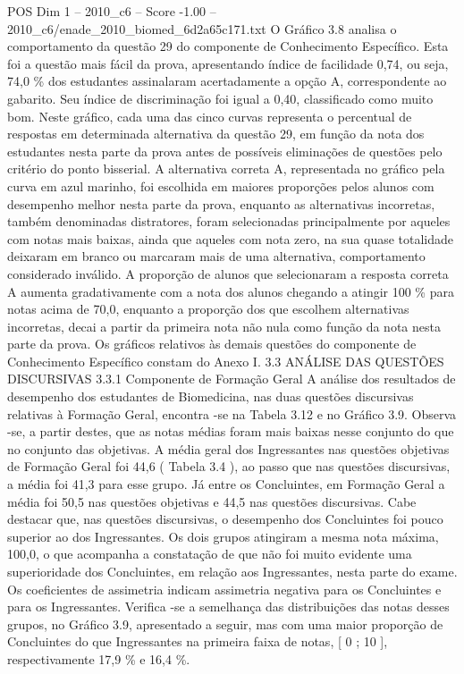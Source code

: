 \begin{textsample}{POS Dim 1 – 2010\_c6 – Score -1.00 – 2010\_c6/enade\_2010\_biomed\_6d2a65c171.txt}
O Gráfico 3.8 analisa o comportamento da questão 29 do componente de Conhecimento Específico.
Esta foi a questão mais fácil da prova, apresentando índice de facilidade 0,74, ou seja, 74,0 \% dos estudantes assinalaram acertadamente a opção A, correspondente ao gabarito.
Seu índice de discriminação foi igual a 0,40, classificado como muito bom.
Neste gráfico, cada uma das cinco curvas representa o percentual de respostas em determinada alternativa da questão 29, em função da nota dos estudantes nesta parte da prova antes de possíveis eliminações de questões pelo critério do ponto bisserial.
A alternativa correta A, representada no gráfico pela curva em azul marinho, foi escolhida em maiores proporções pelos alunos com desempenho melhor nesta parte da prova, enquanto as alternativas incorretas, também denominadas distratores, foram selecionadas principalmente por aqueles com notas mais baixas, ainda que aqueles com nota zero, na sua quase totalidade deixaram em branco ou marcaram mais de uma alternativa, comportamento considerado inválido.
A proporção de alunos que selecionaram a resposta correta A aumenta gradativamente com a nota dos alunos chegando a atingir 100 \% para notas acima de 70,0, enquanto a proporção dos que escolhem alternativas incorretas, decai a partir da primeira nota não nula como função da nota nesta parte da prova.
Os gráficos relativos às demais questões do componente de Conhecimento Específico constam do Anexo I. 3.3 ANÁLISE DAS QUESTÕES DISCURSIVAS 3.3.1 Componente de Formação Geral A análise dos resultados de desempenho dos estudantes de Biomedicina, nas duas questões discursivas relativas à Formação Geral, encontra -se na Tabela 3.12 e no Gráfico 3.9.
Observa -se, a partir destes, que as notas médias foram mais baixas nesse conjunto do que no conjunto das objetivas.
A média geral dos Ingressantes nas questões objetivas de Formação Geral foi 44,6 ( Tabela 3.4 ), ao passo que nas questões discursivas, a média foi 41,3 para esse grupo.
Já entre os Concluintes, em Formação Geral a média foi 50,5 nas questões objetivas e 44,5 nas questões discursivas.
Cabe destacar que, nas questões discursivas, o desempenho dos Concluintes foi pouco superior ao dos Ingressantes.
Os dois grupos atingiram a mesma nota máxima, 100,0, o que acompanha a constatação de que não foi muito evidente uma superioridade dos Concluintes, em relação aos Ingressantes, nesta parte do exame.
Os coeficientes de assimetria indicam assimetria negativa para os Concluintes e para os Ingressantes.
Verifica -se a semelhança das distribuições das notas desses grupos, no Gráfico 3.9, apresentado a seguir, mas com uma maior proporção de Concluintes do que Ingressantes na primeira faixa de notas, [ 0 ; 10 ], respectivamente 17,9 \% e 16,4 \%.

\end{textsample}
